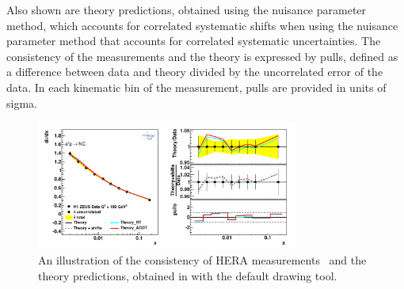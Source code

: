 \begin{description}
Also shown are theory predictions, obtained using the nuisance parameter method, 
which accounts for correlated systematic
shifts when using the nuisance parameter method that accounts for 
correlated systematic uncertainties. 
The consistency of the measurements and the theory is expressed by pulls, defined as a difference between data 
and theory divided by the uncorrelated error of the data. 
In each kinematic bin of the measurement, pulls are provided in units of sigma.  
\begin{figure}[!ht]
   \centering
   \includegraphics[width=8.6cm]{datatheory.pdf}
   \caption{An illustration of the consistency of HERA measurements~\cite{h1zeus:2009wt} and the theory predictions, 
       obtained in \fitter with the default drawing tool.} 
 \label{fig:data}
\end{figure}

\end{description}
%


